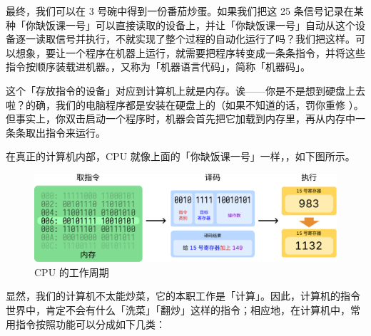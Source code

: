 最终，我们可以在 3 号碗中得到一份番茄炒蛋。如果我们把这 25 条信号记录在某种「你缺饭课一号」可以直接读取的设备上，并让「你缺饭课一号」自动从这个设备逐一读取信号并执行，不就实现了整个过程的自动化运行了吗？我们把这样。可以想象，要让一个程序在机器上运行，就需要把程序转变成一条条指令，并将这些指令按顺序装载进机器。，又称为「机器语言代码」，简称「机器码」。

\begin{note}
  这个「存放指令的设备」对应到计算机上就是内存。诶——你是不是想到硬盘上去啦？的确，我们的电脑程序都是安装在硬盘上的（如果不知道的话，罚你重修 ）。但事实上，你双击启动一个程序时，机器会首先把它加载到内存里，再从内存中一条条取出指令来运行。
\end{note}

在真正的计算机内部，CPU 就像上面的「你缺饭课一号」一样，，如下图所示。

\begin{figure}[htb!]
  \centering
  \includegraphics[width=.8\textwidth]{assets/surpass/CPU_exec.pdf}
  \caption{CPU 的工作周期}
  \label{fig:CPU_exec}
\end{figure}

显然，我们的计算机不太能炒菜，它的本职工作是「计算」。因此，计算机的指令世界中，肯定不会有什么「洗菜」「翻炒」这样的指令；相应地，在计算机中，常用指令按照功能可以分成如下几类：

